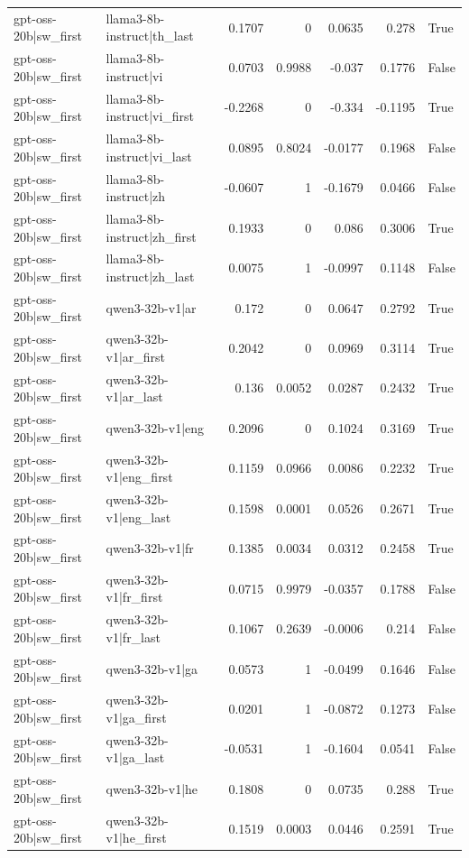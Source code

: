 \begin{table}
\begin{tabular}{l l r r r r l}
gpt-oss-20b|sw_first & llama3-8b-instruct|th_last & 0.1707 & 0 & 0.0635 & 0.278 & True \\
gpt-oss-20b|sw_first & llama3-8b-instruct|vi & 0.0703 & 0.9988 & -0.037 & 0.1776 & False \\
gpt-oss-20b|sw_first & llama3-8b-instruct|vi_first & -0.2268 & 0 & -0.334 & -0.1195 & True \\
gpt-oss-20b|sw_first & llama3-8b-instruct|vi_last & 0.0895 & 0.8024 & -0.0177 & 0.1968 & False \\
gpt-oss-20b|sw_first & llama3-8b-instruct|zh & -0.0607 & 1 & -0.1679 & 0.0466 & False \\
gpt-oss-20b|sw_first & llama3-8b-instruct|zh_first & 0.1933 & 0 & 0.086 & 0.3006 & True \\
gpt-oss-20b|sw_first & llama3-8b-instruct|zh_last & 0.0075 & 1 & -0.0997 & 0.1148 & False \\
gpt-oss-20b|sw_first & qwen3-32b-v1|ar & 0.172 & 0 & 0.0647 & 0.2792 & True \\
gpt-oss-20b|sw_first & qwen3-32b-v1|ar_first & 0.2042 & 0 & 0.0969 & 0.3114 & True \\
gpt-oss-20b|sw_first & qwen3-32b-v1|ar_last & 0.136 & 0.0052 & 0.0287 & 0.2432 & True \\
gpt-oss-20b|sw_first & qwen3-32b-v1|eng & 0.2096 & 0 & 0.1024 & 0.3169 & True \\
gpt-oss-20b|sw_first & qwen3-32b-v1|eng_first & 0.1159 & 0.0966 & 0.0086 & 0.2232 & True \\
gpt-oss-20b|sw_first & qwen3-32b-v1|eng_last & 0.1598 & 0.0001 & 0.0526 & 0.2671 & True \\
gpt-oss-20b|sw_first & qwen3-32b-v1|fr & 0.1385 & 0.0034 & 0.0312 & 0.2458 & True \\
gpt-oss-20b|sw_first & qwen3-32b-v1|fr_first & 0.0715 & 0.9979 & -0.0357 & 0.1788 & False \\
gpt-oss-20b|sw_first & qwen3-32b-v1|fr_last & 0.1067 & 0.2639 & -0.0006 & 0.214 & False \\
gpt-oss-20b|sw_first & qwen3-32b-v1|ga & 0.0573 & 1 & -0.0499 & 0.1646 & False \\
gpt-oss-20b|sw_first & qwen3-32b-v1|ga_first & 0.0201 & 1 & -0.0872 & 0.1273 & False \\
gpt-oss-20b|sw_first & qwen3-32b-v1|ga_last & -0.0531 & 1 & -0.1604 & 0.0541 & False \\
gpt-oss-20b|sw_first & qwen3-32b-v1|he & 0.1808 & 0 & 0.0735 & 0.288 & True \\
gpt-oss-20b|sw_first & qwen3-32b-v1|he_first & 0.1519 & 0.0003 & 0.0446 & 0.2591 & True \\

\end{tabular}
\end{table}

